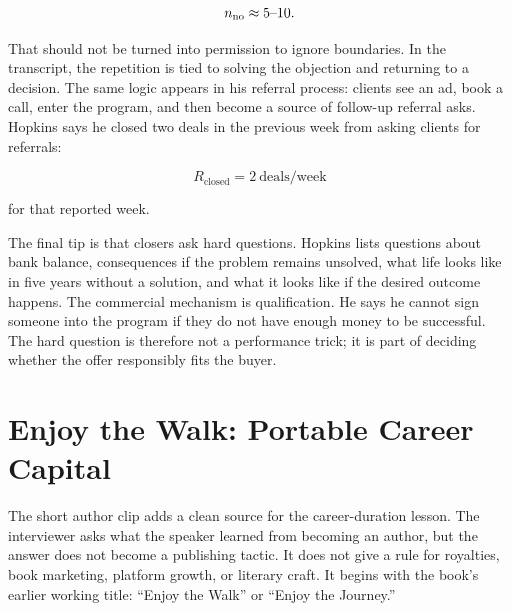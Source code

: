 \documentclass[11pt,oneside]{book}
\begin{document}
\begin{equation}
n_{\mathrm{no}} \approx 5\hbox{--}10.
\end{equation}

That should not be turned into permission to ignore boundaries. In the transcript, the repetition is tied to solving the objection and returning to a decision. The same logic appears in his referral process: clients see an ad, book a call, enter the program, and then become a source of follow-up referral asks. Hopkins says he closed two deals in the previous week from asking clients for referrals:

\begin{equation}
R_{\mathrm{closed}} = 2\ \mathrm{deals/week}
\end{equation}

for that reported week.

The final tip is that closers ask hard questions. Hopkins lists questions about bank balance, consequences if the problem remains unsolved, what life looks like in five years without a solution, and what it looks like if the desired outcome happens. The commercial mechanism is qualification. He says he cannot sign someone into the program if they do not have enough money to be successful. The hard question is therefore not a performance trick; it is part of deciding whether the offer responsibly fits the buyer.


\section{Enjoy the Walk: Portable Career Capital}

The short author clip adds a clean source for the career-duration lesson. The interviewer asks what the speaker learned from becoming an author, but the answer does not become a publishing tactic. It does not give a rule for royalties, book marketing, platform growth, or literary craft. It begins with the book's earlier working title: ``Enjoy the Walk'' or ``Enjoy the Journey.''
\end{document}
